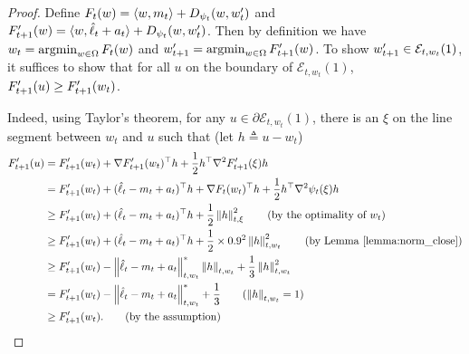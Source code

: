 \begin{proof}
Define $F_{t}(w)=\langle {w, m_t} \rangle+D_{\psi_t}(w, w_t^\prime)$ and $F_{t+1}^\prime(w)=\langle {w, \hat{\ell}_t+a_t} \rangle+D_{\psi_t}(w, w_t^\prime)$. Then by definition we have $w_t=\operatorname*{argmin}_{w\in\Omega}F_{t}(w)$ and $w_{t+1}^\prime=\operatorname*{argmin}_{w\in\Omega}F_{t+1}^\prime(w)$. To show $w_{t+1}^\prime\in \mathcal{E}_{t,w_t}(1)$, it suffices to show that for all $u$ on the boundary of $\mathcal{E}_{t,w_t}(1)$, $F^\prime_{t+1}(u)\geq F^\prime_{t+1}(w_t)$. 

Indeed, using Taylor's theorem, for any $u\in \partial \mathcal{E}_{t,w_t}(1)$, there is an $\xi$ on the line segment between $w_t$ and $u$ such that (let $h\triangleq u-w_t$)
\begin{align*}
F^\p_{t+1}(u)&=F^\p_{t+1}(w_t)+\nabla F^{\p}_{t+1} (w_t)^\top h+ \frac{1}{2}h^\top\nabla^2 F^\p_{t+1}(\xi)h \\
&=F^\p_{t+1}(w_t)+ (\hat{\ell}_t-m_t+a_t)^\top h +\nabla F_t (w_t)^\top h+ \frac{1}{2}h^\top\nabla^2 \psi_t(\xi)h \\
&\geq F^\p_{t+1}(w_t)+ (\hat{\ell}_t-m_t+a_t)^\top h + \frac{1}{2}\norm{h}_{t,\xi}^2 \tag{by the optimality of $w_t$}\\
&\geq F^\p_{t+1}(w_t)+ (\hat{\ell}_t-m_t+a_t)^\top h + \frac{1}{2}\times0.9^2\norm{h}_{t,w_t}^2 \tag{by Lemma \ref{lemma:norm_close}} \\
&\geq F^\p_{t+1}(w_t)- \norm{\hat{\ell}_t-m_t+a_t}^*_{t,w_t} \norm{h}_{t,w_t} + \frac{1}{3}\norm{h}_{t,w_t}^2 \\
&=F^\p_{t+1}(w_t)- \norm{\hat{\ell}_t-m_t+a_t}^*_{t,w_t} + \frac{1}{3} \tag{$\norm{h}_{t,w_t}=1$}\\
&\geq F^\p_{t+1}(w_t). \tag{by the assumption}
\end{align*}
\end{proof}

